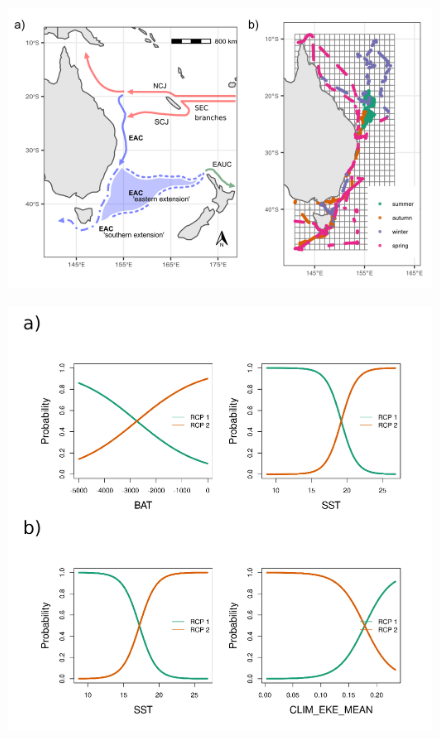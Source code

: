 \documentclass{article}
\begin{document}
\begin{landscape}

\begin{figure}

{\centering \includegraphics[width=1\linewidth]{../EDA/Fig1-study-area-raw-counts} 

}

\caption{ }\label{fig:fig1-study-area}
\end{figure}

\end{landscape}

\newpage

\begin{figure}

{\centering \includegraphics[width=1\linewidth]{../results/Fig4_partial-plots-spring} 

}

\caption{ }\label{fig:fig2-partial-plots}
\end{figure}
\end{document}
